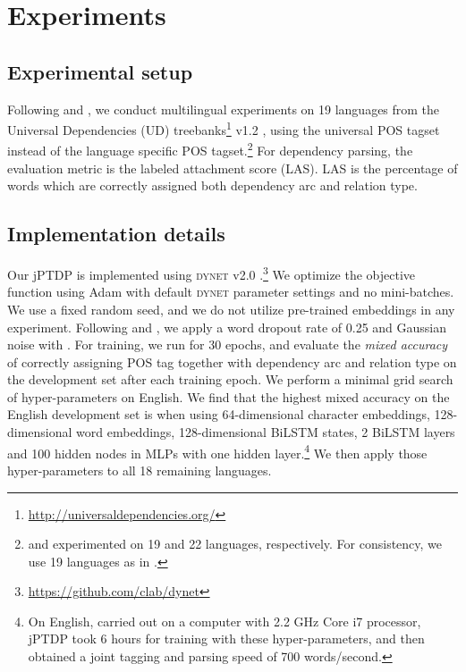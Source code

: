 \documentclass[11pt,letterpaper]{article}
\begin{document}
\section{Experiments}

\subsection{Experimental setup}

Following \citet{zhang-weiss:2016:P16-1} and \citet{plankP16}, we conduct  multilingual experiments on 19 languages from the Universal Dependencies (UD) treebanks\footnote{\url{http://universaldependencies.org/}}  v1.2 \citep{11234/1-1548}, 
using the universal POS tagset  \citep{PetrovDM12}  instead of the language specific
POS tagset.\footnote{ \citet{zhang-weiss:2016:P16-1}  and \citet{plankP16} experimented on 19 and 22 languages, respectively. For consistency, we use 19 languages as in \citet{zhang-weiss:2016:P16-1}.}
For dependency parsing, the evaluation metric is the labeled attachment score (LAS). LAS  is the percentage of words which are correctly assigned both dependency arc and relation type. 

\subsection{Implementation details}\label{ssec:impl}

Our jPTDP is implemented using  \textsc{dynet} v2.0 \citep{dynet}.\footnote{\url{https://github.com/clab/dynet}} We optimize the objective function using Adam  \citep{KingmaB14} with default \textsc{dynet} parameter settings and no mini-batches. We  use a fixed random seed, and we do not utilize pre-trained embeddings in any experiment. Following \citet{TACL885} and \citet{plankP16}, we apply a word dropout rate of 0.25 and Gaussian noise with . 
For training, we run for 30 epochs, and  evaluate the \textit{mixed accuracy} of correctly assigning
POS tag together with dependency arc and relation type on the development set after each training epoch. 
We perform a minimal grid search of hyper-parameters on English. We find that the highest mixed accuracy on the English development set is when using 64-dimensional character embeddings, 128-dimensional word embeddings,   128-dimensional BiLSTM states, 2 BiLSTM layers and  100 hidden nodes in MLPs with one hidden layer.\footnote{On English, carried out on a computer with 2.2 GHz Core i7 processor, jPTDP took  6 hours for training with these hyper-parameters,  and then obtained a joint tagging and parsing speed of 700 words/second.} We then apply those hyper-parameters to all 18 remaining languages. 
\end{document}
